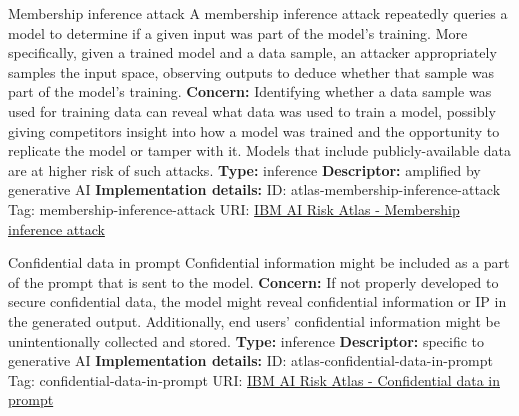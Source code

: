 \begin{definitionbox}{Membership inference attack}
A membership inference attack repeatedly queries a model to determine if a given input was part of the model's training. More specifically, given a trained model and a data sample, an attacker appropriately samples the input space, observing outputs to deduce whether that sample was part of the model's training.\newline\newline
\textbf{Concern: }Identifying whether a data sample was used for training data can reveal what data was used to train a model, possibly giving competitors insight into how a model was trained and the opportunity to replicate the model or tamper with it. Models that include publicly-available data are at higher risk of such attacks.\newline\newline
\textbf{Type: }inference\newline
\textbf{Descriptor: }amplified by generative AI \newline\newline
\textbf{Implementation details: } \newline
ID: atlas-membership-inference-attack \newline
Tag: membership-inference-attack \newline
URI:  \href{https://www.ibm.com/docs/en/watsonx/saas?topic=SSYOK8/wsj/ai-risk-atlas/membership-inference-attack.html}{IBM AI Risk Atlas - Membership inference attack}\newline
\end{definitionbox}
\begin{definitionbox}{Confidential data in prompt}
Confidential information might be included as a part of the prompt that is sent to the model.\newline\newline
\textbf{Concern: }If not properly developed to secure confidential data, the model might reveal confidential information or IP in the generated output. Additionally, end users' confidential information might be unintentionally collected and stored.\newline\newline
\textbf{Type: }inference\newline
\textbf{Descriptor: }specific to generative AI \newline\newline
\textbf{Implementation details: } \newline
ID: atlas-confidential-data-in-prompt \newline
Tag: confidential-data-in-prompt \newline
URI:  \href{https://www.ibm.com/docs/en/watsonx/saas?topic=SSYOK8/wsj/ai-risk-atlas/confidential-data-in-prompt.html}{IBM AI Risk Atlas - Confidential data in prompt}\newline
\end{definitionbox}
